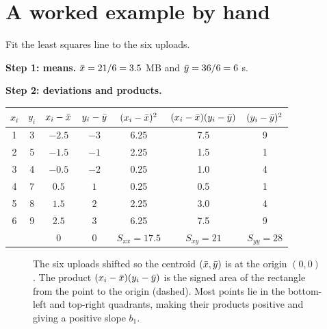 \section{A worked example by hand}
\label{sec:slr-worked}

\begin{walkbox}
Fit the least squares line to the six uploads.

\textbf{Step 1: means.} $\bar{x} = 21/6 = 3.5$ MB and $\bar{y} = 36/6 = 6$ s.

\textbf{Step 2: deviations and products.}

\begin{center}
\begin{tabular}{ccccccc}
\toprule
$x_i$ & $y_i$ & $x_i-\bar{x}$ & $y_i-\bar{y}$ & $(x_i-\bar{x})^2$ & $(x_i-\bar{x})(y_i-\bar{y})$ & $(y_i-\bar{y})^2$ \\
\midrule
1 & 3 & $-2.5$ & $-3$ & 6.25 & 7.5 & 9 \\
2 & 5 & $-1.5$ & $-1$ & 2.25 & 1.5 & 1 \\
3 & 4 & $-0.5$ & $-2$ & 0.25 & 1.0 & 4 \\
4 & 7 & $0.5$ & $1$ & 0.25 & 0.5 & 1 \\
5 & 8 & $1.5$ & $2$ & 2.25 & 3.0 & 4 \\
6 & 9 & $2.5$ & $3$ & 6.25 & 7.5 & 9 \\
\midrule
 & & 0 & 0 & $S_{xx}=17.5$ & $S_{xy}=21$ & $S_{yy}=28$ \\
\bottomrule
\end{tabular}
\end{center}


\begin{figure}[H]
\centering
{}
\caption{The six uploads shifted so the centroid $(\bar{x},\bar{y})$ is at the origin $(0,0)$. The product $(x_i-\bar{x})(y_i-\bar{y})$ is the signed area of the rectangle from the point to the origin (dashed). Most points lie in the bottom-left and top-right quadrants, making their products positive and giving a positive slope $b_1$.}
\label{fig:slr-deviations}
\end{figure}


\end{walkbox}
